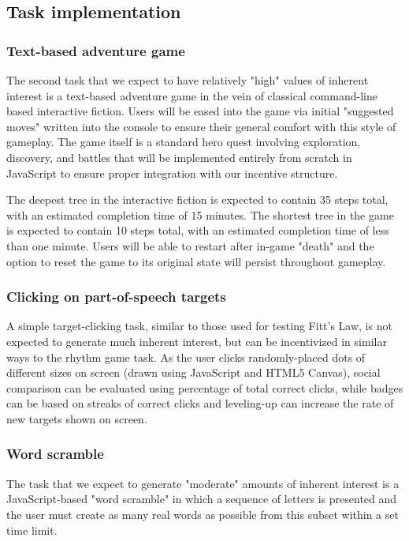  \subsection{Task implementation}
\subsubsection{Text-based adventure game}
The second task that we expect to have relatively "high" values of inherent interest is a text-based adventure game in the vein of classical command-line based interactive fiction. Users will be eased into the game via initial "suggested moves" written into the console to ensure their general comfort with this style of gameplay. The game itself is a standard hero quest involving exploration, discovery, and battles that will be implemented entirely from scratch in JavaScript to ensure proper integration with our incentive structure.

The deepest tree in the interactive fiction is expected to contain 35 steps total, with an estimated completion time of 15 minutes. The shortest tree in the game is expected to contain 10 steps total, with an estimated completion time of less than one minute. Users will be able to restart after in-game "death" and the option to reset the game to its original state will persist throughout gameplay. 
\subsubsection{Clicking on part-of-speech targets} 
A simple target-clicking task, similar to those used for testing Fitt's Law, is not expected to generate much inherent interest, but can be incentivized in similar ways to the rhythm game task. As the user clicks randomly-placed dots of different sizes on screen (drawn using JavaScript and HTML5 Canvas), social comparison can be evaluated using percentage of total correct clicks, while badges can be based on streaks of correct clicks and leveling-up can increase the rate of new targets shown on screen. 
 
\subsubsection{Word scramble} 
The task that we expect to generate "moderate" amounts of inherent interest is a JavaScript-based "word scramble" in which a sequence of letters is presented and the user must create as many real words as possible from this subset within a set time limit.
